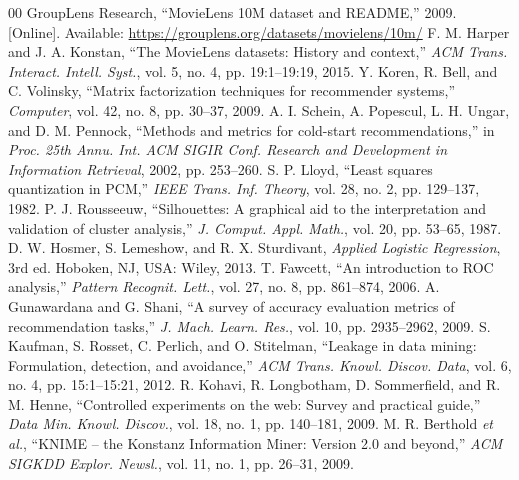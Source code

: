 \documentclass[conference]{IEEEtran}
\begin{document}
\begin{thebibliography}{00}
 GroupLens Research, ``MovieLens 10M dataset and README,'' 2009. [Online]. Available: \url{https://grouplens.org/datasets/movielens/10m/}
 F. M. Harper and J. A. Konstan, ``The MovieLens datasets: History and context,'' \textit{ACM Trans. Interact. Intell. Syst.}, vol. 5, no. 4, pp. 19:1--19:19, 2015.
 Y. Koren, R. Bell, and C. Volinsky, ``Matrix factorization techniques for recommender systems,'' \textit{Computer}, vol. 42, no. 8, pp. 30--37, 2009.
 A. I. Schein, A. Popescul, L. H. Ungar, and D. M. Pennock, ``Methods and metrics for cold-start recommendations,'' in \textit{Proc. 25th Annu. Int. ACM SIGIR Conf. Research and Development in Information Retrieval}, 2002, pp. 253--260.
 S. P. Lloyd, ``Least squares quantization in PCM,'' \textit{IEEE Trans. Inf. Theory}, vol. 28, no. 2, pp. 129--137, 1982.
 P. J. Rousseeuw, ``Silhouettes: A graphical aid to the interpretation and validation of cluster analysis,'' \textit{J. Comput. Appl. Math.}, vol. 20, pp. 53--65, 1987.
 D. W. Hosmer, S. Lemeshow, and R. X. Sturdivant, \textit{Applied Logistic Regression}, 3rd ed. Hoboken, NJ, USA: Wiley, 2013.
 T. Fawcett, ``An introduction to ROC analysis,'' \textit{Pattern Recognit. Lett.}, vol. 27, no. 8, pp. 861--874, 2006.
 A. Gunawardana and G. Shani, ``A survey of accuracy evaluation metrics of recommendation tasks,'' \textit{J. Mach. Learn. Res.}, vol. 10, pp. 2935--2962, 2009.
 S. Kaufman, S. Rosset, C. Perlich, and O. Stitelman, ``Leakage in data mining: Formulation, detection, and avoidance,'' \textit{ACM Trans. Knowl. Discov. Data}, vol. 6, no. 4, pp. 15:1--15:21, 2012.
 R. Kohavi, R. Longbotham, D. Sommerfield, and R. M. Henne, ``Controlled experiments on the web: Survey and practical guide,'' \textit{Data Min. Knowl. Discov.}, vol. 18, no. 1, pp. 140--181, 2009.
 M. R. Berthold \textit{et al.}, ``KNIME -- the Konstanz Information Miner: Version 2.0 and beyond,'' \textit{ACM SIGKDD Explor. Newsl.}, vol. 11, no. 1, pp. 26--31, 2009.
\end{thebibliography}
\end{document}
